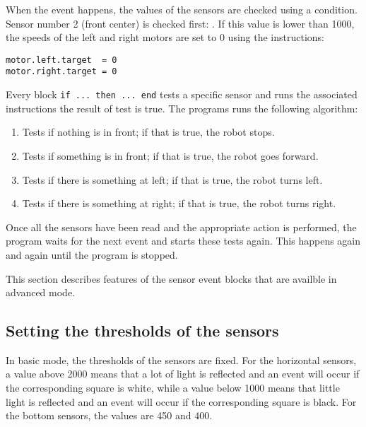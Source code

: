When the event happens, the values of the sensors are checked using a
condition. Sensor number 2 (front center) is checked first:
. If this value is lower than 1000, the speeds of
the left and right motors are set to 0 using the instructions:

\begin{verbatim}
motor.left.target  = 0
motor.right.target = 0
\end{verbatim}

Every block \verb+if ... then ... end+ tests a specific sensor and runs
the associated instructions the result of test is true. The programs
runs the following algorithm:

\begin{enumerate}[start=0,noitemsep,nosep]
\item Tests if nothing is in front; if that is true, the robot stops.
\item Tests if something is in front; if that is true, the robot goes forward.
\item Tests if there is something at left; if that is true, the robot turns left.
\item Tests if there is something at right; if that is true, the robot turns right.
\end{enumerate}

Once all the sensors have been read and the appropriate action is
performed, the program waits for the next event  and starts
these tests again. This happens again and again until the program is
stopped.





This section describes features of the sensor event blocks that are
availble in advanced mode.

\subsection*{Setting the thresholds of the sensors}

In basic mode, the thresholds of the sensors are fixed. For the
horizontal sensors, a value above 2000 means that a lot of light is
reflected and an event will occur if the corresponding square is white,
while a value below 1000 means that little light is reflected and an
event will occur if the corresponding square is black. For the bottom
sensors, the values are 450 and 400.

